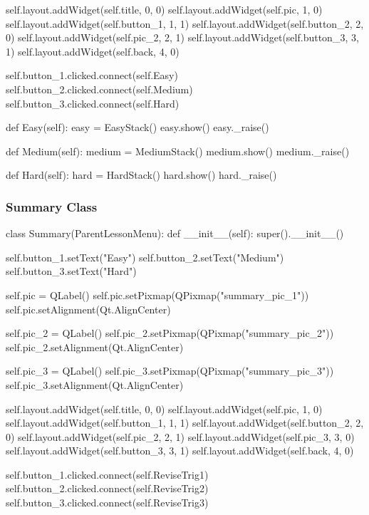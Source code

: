 \begin{landscape}
\begin{python}
        self.layout.addWidget(self.title, 0, 0)
        self.layout.addWidget(self.pic, 1, 0)
        self.layout.addWidget(self.button_1, 1, 1)
        self.layout.addWidget(self.button_2, 2, 0)
        self.layout.addWidget(self.pic_2, 2, 1)
        self.layout.addWidget(self.button_3, 3, 1)
        self.layout.addWidget(self.back, 4, 0)

        self.button_1.clicked.connect(self.Easy)
        self.button_2.clicked.connect(self.Medium)
        self.button_3.clicked.connect(self.Hard)
    
    def Easy(self):
        easy = EasyStack()
        easy.show()
        easy._raise()

    def Medium(self):
        medium = MediumStack()
        medium.show()
        medium._raise()

    def Hard(self):
        hard = HardStack()
        hard.show()
        hard._raise()
\end{python}

\subsubsection{Summary Class}

\begin{python}
class Summary(ParentLessonMenu):
    def __init__(self):
        super().__init__()

        self.button_1.setText("Easy")
        self.button_2.setText("Medium")
        self.button_3.setText("Hard")

        self.pic = QLabel()
        self.pic.setPixmap(QPixmap("summary_pic_1"))
        self.pic.setAlignment(Qt.AlignCenter)

        self.pic_2 = QLabel()
        self.pic_2.setPixmap(QPixmap("summary_pic_2"))
        self.pic_2.setAlignment(Qt.AlignCenter)

        self.pic_3 = QLabel()
        self.pic_3.setPixmap(QPixmap("summary_pic_3"))
        self.pic_3.setAlignment(Qt.AlignCenter)
        
        self.layout.addWidget(self.title, 0, 0)
        self.layout.addWidget(self.pic, 1, 0)
        self.layout.addWidget(self.button_1, 1, 1)
        self.layout.addWidget(self.button_2, 2, 0)
        self.layout.addWidget(self.pic_2, 2, 1)
        self.layout.addWidget(self.pic_3, 3, 0)
        self.layout.addWidget(self.button_3, 3, 1)
        self.layout.addWidget(self.back, 4, 0)

        self.button_1.clicked.connect(self.ReviseTrig1)
        self.button_2.clicked.connect(self.ReviseTrig2)
        self.button_3.clicked.connect(self.ReviseTrig3)
    

\end{python}
\end{landscape}
